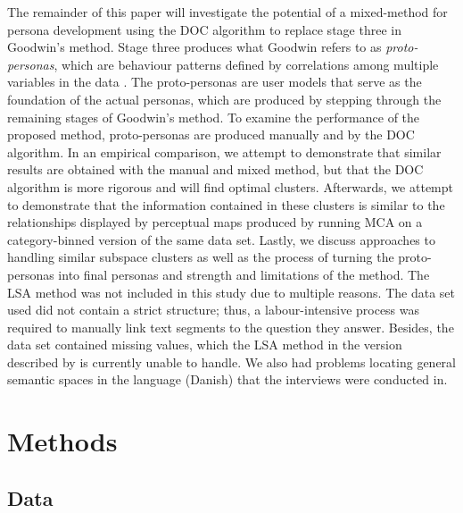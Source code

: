 The remainder of this paper will investigate the potential of a mixed-method for persona development using the DOC algorithm to replace stage three in Goodwin's method. Stage three produces what Goodwin refers to as \textit{proto-personas}, which are behaviour patterns defined by correlations among multiple variables in the data \citep{Goodwin2009}. The proto-personas are user models that serve as the foundation of the actual personas, which are produced by stepping through the remaining stages of Goodwin's method. To examine the performance of the proposed method, proto-personas are produced manually and by the DOC algorithm. In an empirical comparison, we attempt to demonstrate that similar results are obtained with the manual and mixed method, but that the DOC algorithm is more rigorous and will find optimal clusters. Afterwards, we attempt to demonstrate that the information contained in these clusters is similar to the relationships displayed by perceptual maps produced by running MCA on a category-binned version of the same data set. Lastly, we discuss approaches to handling similar subspace clusters as well as the process of turning the proto-personas into final personas and strength and limitations of the method. The LSA method was not included in this study due to multiple reasons. The data set used did not contain a strict structure; thus, a labour-intensive process was required to manually link text segments to the question they answer. Besides, the data set contained missing values, which the LSA method in the version described by \cite{Miaskiewicz2008} is currently unable to handle. We also had problems locating general semantic spaces in the language (Danish) that the interviews were conducted in.



\section{Methods}

\subsection{Data}

